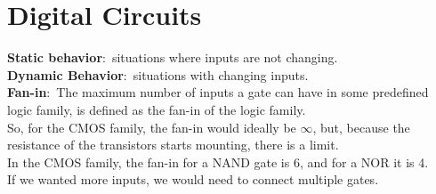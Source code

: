 \documentclass[nobib]{tufte-handout}
\newcommand{\defn}[2]{\noindent\textbf{#1}:\ #2}
\begin{document}
    \section{Digital Circuits}
    \defn{Static behavior}{situations where inputs are not changing.}\\
    \defn{Dynamic Behavior}{situations with changing inputs.}\\
    \defn{Fan-in}{The maximum number of inputs a gate can have in some predefined logic family, is defined as the fan-in of the logic family.}\\
    So, for the CMOS family, the fan-in would ideally be $\infty$, but, because the resistance of the transistors starts mounting, there is a limit.\\
    In the CMOS family, the fan-in for a NAND gate is 6, and for a NOR it is 4.\\
    If we wanted more inputs, we would need to connect multiple gates.\\
\end{document}
